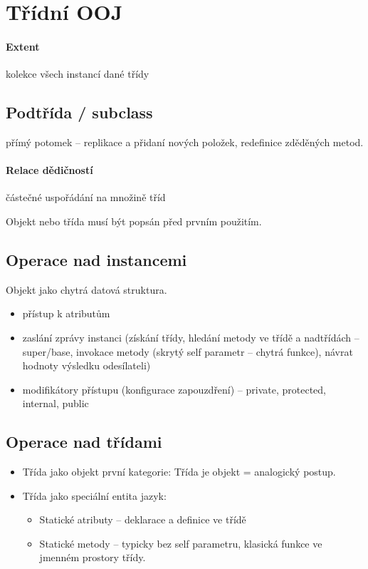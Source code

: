 \documentclass[a4paper, 11pt]{report}
\begin{document}
\section{Třídní OOJ}

\paragraph{Extent} kolekce všech instancí dané třídy

\subsection{Podtřída / subclass} přímý potomek -- replikace a přidaní nových položek, redefinice zděděných metod.

\paragraph{Relace dědičností} částečné uspořádání na množině tříd

Objekt nebo třída musí být popsán před prvním použitím. 

\subsection{Operace nad instancemi}
Objekt jako chytrá datová struktura.
\begin{itemize}
	\item přístup k atributům
	\item zaslání zprávy instanci (získání třídy, hledání metody ve třídě a nadtřídách -- super/base, invokace metody (skrytý self parametr -- chytrá funkce), návrat hodnoty výsledku odesílateli)
	\item modifikátory přístupu (konfigurace zapouzdření) -- private, protected, internal, public
\end{itemize}

\subsection{Operace nad třídami}
\begin{itemize}
	\item Třída jako objekt první kategorie: Třída je objekt = analogický postup.
	\item Třída jako speciální entita jazyk:
	\begin{itemize}
		\item Statické atributy -- deklarace a definice ve třídě
		\item Statické metody -- typicky bez self parametru, klasická funkce ve jmenném prostory třídy.
	\end{itemize}
\end{itemize}
\end{document}
